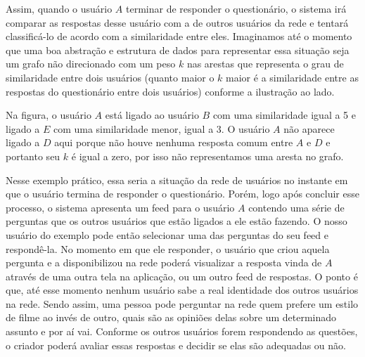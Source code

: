 \documentclass[a4paper, 11pt]{article} %
\begin{document}
Assim, quando o usuário $A$ terminar de responder o questionário, o sistema irá comparar as respostas desse usuário com a de outros usuários da rede e tentará classificá-lo de acordo com a similaridade entre eles. Imaginamos até o momento que uma boa abstração e estrutura de dados para representar essa situação seja um grafo não direcionado com um peso $k$ nas arestas que representa o grau de similaridade entre dois usuários (quanto maior o $k$ maior é a similaridade entre as respostas do questionário entre dois usuários) conforme a ilustração ao lado. 

Na figura, o usuário $A$ está ligado ao usuário $B$ com uma similaridade igual a 5 e ligado a $E$ com uma similaridade menor, igual a 3. O usuário $A$ não aparece ligado a $D$ aqui porque não houve nenhuma resposta comum entre $A$ e $D$ e portanto seu $k$ é igual a zero, por isso não representamos uma aresta no grafo.

Nesse exemplo prático, essa seria a situação da rede de usuários no instante em que o usuário termina de responder o questionário. Porém, logo após concluir esse processo, o sistema apresenta um feed para o usuário $A$ contendo uma série de perguntas que os outros usuários que estão ligados a ele estão fazendo. O nosso usuário do exemplo pode então selecionar uma das perguntas do seu feed e respondê-la. No momento em que ele responder, o usuário que criou aquela pergunta e a disponibilizou na rede poderá visualizar a resposta vinda de $A$ através de uma outra tela na aplicação, ou um outro feed de respostas. O ponto é que, até esse momento nenhum usuário sabe a real identidade dos outros usuários na rede. Sendo assim, uma pessoa pode perguntar na rede quem prefere um estilo de filme ao invés de outro, quais são as opiniões delas sobre um determinado assunto e por aí vai. Conforme os outros usuários forem respondendo as questões, o criador poderá avaliar essas respostas e decidir se elas são adequadas ou não.
\end{document}
